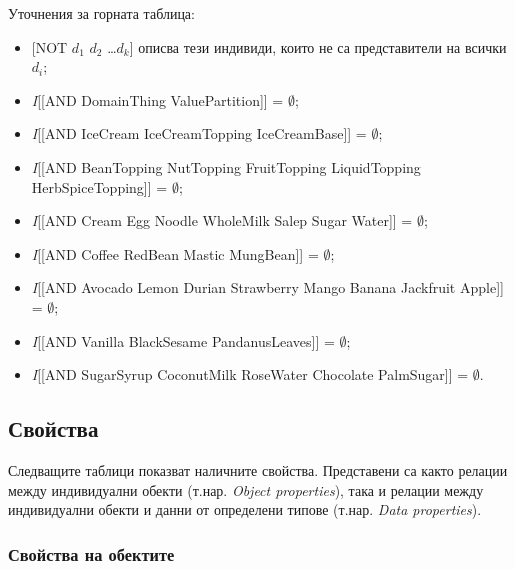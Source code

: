 \documentclass[12pt]{article}
\begin{document}
    Уточнения за горната таблица:

        \begin{itemize} 
            \item{} [NOT $d_1$ $d_2$ \ldots $d_k$] описва тези индивиди, които не са представители на всички $d_i$;
            \item{} \textit{I}[[AND DomainThing ValuePartition]] = $\emptyset$;
            \item{} \textit{I}[[AND IceCream IceCreamTopping IceCreamBase]] = $\emptyset$;
            \item{} \textit{I}[[AND BeanTopping NutTopping FruitTopping LiquidTopping HerbSpiceTopping]] = $\emptyset$;
            \item{} \textit{I}[[AND Cream Egg Noodle WholeMilk Salep Sugar Water]] = $\emptyset$;
            \item{} \textit{I}[[AND Coffee RedBean Mastic MungBean]] = $\emptyset$;
            \item{} \textit{I}[[AND Avocado Lemon Durian Strawberry Mango Banana Jackfruit Apple]] = $\emptyset$;
            \item{} \textit{I}[[AND Vanilla BlackSesame PandanusLeaves]] = $\emptyset$;
            \item{} \textit{I}[[AND SugarSyrup CoconutMilk RoseWater Chocolate PalmSugar]] = $\emptyset$.
        \end{itemize}
    
    \subsection{Свойства}

    Следващите таблици показват наличните свойства. Представени са както релации между индивидуални обекти (т.нар. \textit{Object properties}), така и релации между индивидуални обекти и данни от определени типове (т.нар. \textit{Data properties}).
    
        \subsubsection{Свойства на обектите}
    
\end{document}
